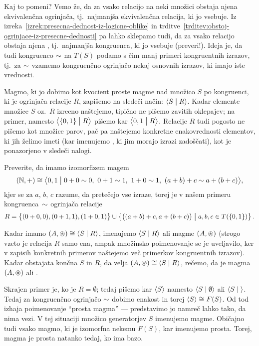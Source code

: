 Kaj to pomeni? Vemo že, da za vsako relacijo na neki množici obstaja njena ekvivalenčna ogrinjača, tj.~najmanjša ekvivalenčna relacija, ki jo vsebuje. Iz izreka~\ref{izrek:presecna-dednost-iz-logicne-oblike} in trditve~\ref{trditev:obstoj-ogrinjace-iz-presecne-dednosti} pa lahko sklepamo tudi, da za vsako relacijo obstaja njena , tj.~najmanjša kongruenca, ki jo vsebuje (preveri!). Ideja je, da tudi kongruenco $\sim$ na $T(S)$ podamo s čim manj primeri kongruentnih izrazov, tj.~za $\sim$ vzamemo kongruenčno ogrinjačo nekaj osnovnih izrazov, ki imajo iste vrednosti.

Magmo, ki jo dobimo kot kvocient proste magme nad množico $S$ po kongruenci, ki je ogrinjača relacije $R$, zapišemo na sledeči način: $\pres{S}{R}$. Kadar elemente množice $S$ oz.~$R$ izrecno naštejemo, tipično ne pišemo zavitih oklepajev; na primer, namesto $\pres[1]{\set{0, 1}}{R}$ pišemo kar $\pres[1]{0, 1}{R}$. Relacije $R$ tudi pogosto ne pišemo kot množice parov, pač pa naštejemo konkretne enakovrednosti elementov, ki jih želimo imeti (kar imenujemo , ki jim morajo izrazi zadoščati), kot je ponazorjeno v sledeči nalogi.

\begin{naloga}\label{naloga:predstavitev-aditivne-magme-N}
Preverite, da imamo izomorfizem magem
\[(\NN, +) \ism \pres[1]{0, 1}{0 + 0 \equ 0,\ 0 + 1 \equ 1,\ 1 + 0 \equ 1,\ (a + b) + c \equ a + (b + c)},\]
kjer se za $a$, $b$, $c$ razume, da pretečejo vse izraze, torej je v našem primeru kongruenca~$\sim$ ogrinjača relacije
\[R = \set[1]{(0 + 0, 0), (0 + 1, 1), (1 + 0, 1)} \cup \set{\big((a + b) + c, a + (b + c)\big)}{a, b, c \in T(\set{0, 1})}.\]
\end{naloga}

Kadar imamo $(A, \oper) \ism \pres{S}{R}$, imenujemo $\pres{S}{R}$  ali  magme $(A, \mathop{\circledast}\nolimits)$  (strogo vzeto je relacija $R$ samo ena, ampak množinsko poimenovanje se je uveljavilo, ker v zapisih konkretnih primerov naštejemo več primerkov kongruentnih izrazov). Kadar obstajata končna $S$ in $R$, da velja $(A, \oper) \ism \pres{S}{R}$, rečemo, da je magma $(A, \mathop{\circledast}\nolimits)$  ali .

Skrajen primer je, ko je $R = \emptyset$; tedaj pišemo kar $\pres{S}$ namesto $\pres{S}{\emptyset}$ ali $\pres{S}{ }$. Tedaj za kongruenčno ogrinjačo $\sim$ dobimo enakost in torej $\pres{S} \ism F(S)$. Od tod izhaja poimenovanje ``prosta magma'' --- predstavimo jo namreč lahko tako, da nima vezi. V tej situaciji množico generatorjev $S$ imenujemo  magme. Običajno tudi vsako magmo, ki je izomorfna nekemu $F(S)$, kar imenujemo prosta. Torej, magma je prosta natanko tedaj, ko ima bazo.

